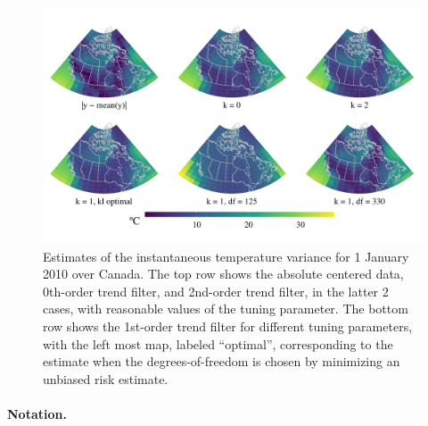 \documentclass[ejs,noshowframe]{imsart}
\theoremstyle{plain}
\theoremstyle{definition}
\begin{document}
\begin{figure}[t!]
  \centering
  \includegraphics[width=.9\textwidth]{temp-ex.pdf}
  \caption{Estimates of the instantaneous temperature variance for 1 January
    2010 over Canada. The top row shows the absolute centered data,
    0th-order trend 
    filter, and 2nd-order trend filter, in the latter 2 cases, with
    reasonable values of the tuning parameter. The bottom row shows the
    1st-order 
    trend filter for different tuning parameters, with the left most map,
    labeled ``optimal'', 
    corresponding to the estimate when the degrees-of-freedom is chosen by
    minimizing an unbiased risk estimate.} 
  \label{fig:canada-temp}
\end{figure}


\paragraph*{Notation.}
\end{document}
